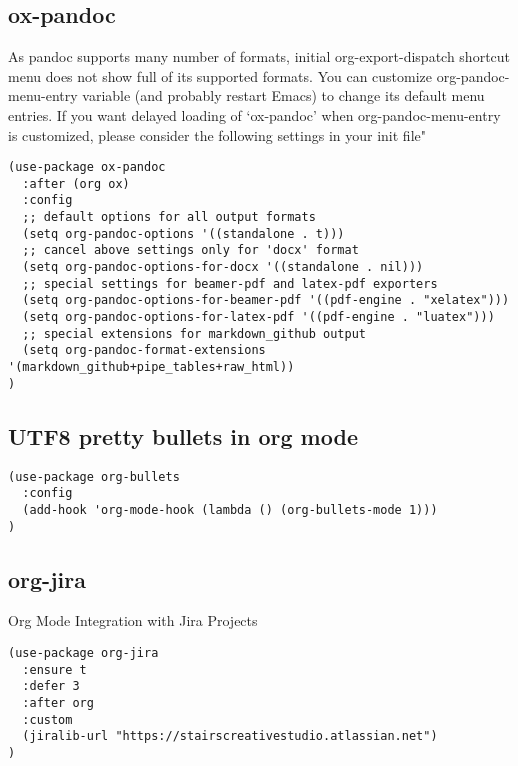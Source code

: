 \documentclass[11pt]{article}
\begin{document}
\subsection*{ox-pandoc}
\label{sec:org92298f7}

\begin{NOTE}
As pandoc supports many number of formats, initial org-export-dispatch
shortcut menu does not show full of its supported formats. You can customize
org-pandoc-menu-entry variable (and probably restart Emacs) to change its
default menu entries.
If you want delayed loading of `ox-pandoc’ when org-pandoc-menu-entry
is customized, please consider the following settings in your init file"
\end{NOTE}

\begin{verbatim}
(use-package ox-pandoc
  :after (org ox)
  :config
  ;; default options for all output formats
  (setq org-pandoc-options '((standalone . t)))
  ;; cancel above settings only for 'docx' format
  (setq org-pandoc-options-for-docx '((standalone . nil)))
  ;; special settings for beamer-pdf and latex-pdf exporters
  (setq org-pandoc-options-for-beamer-pdf '((pdf-engine . "xelatex")))
  (setq org-pandoc-options-for-latex-pdf '((pdf-engine . "luatex")))
  ;; special extensions for markdown_github output
  (setq org-pandoc-format-extensions '(markdown_github+pipe_tables+raw_html))
)
\end{verbatim}

\subsection*{UTF8 pretty bullets in org mode}
\label{sec:org02fa59f}
\begin{verbatim}
(use-package org-bullets
  :config
  (add-hook 'org-mode-hook (lambda () (org-bullets-mode 1)))
)
\end{verbatim}

\subsection*{org-jira}
\label{sec:org7b1e877}

Org Mode Integration with Jira Projects

\begin{verbatim}
(use-package org-jira
  :ensure t
  :defer 3
  :after org
  :custom
  (jiralib-url "https://stairscreativestudio.atlassian.net")
)
\end{verbatim}
\end{document}

